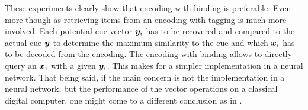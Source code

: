 These experiments clearly show that encoding with binding is preferable.
Even more though as retrieving items from an encoding with tagging is much more involved.
Each potential cue vector $\bm{y}_i$ has to be recovered and compared to the actual cue $\bm{y}$ to determine the maximum similarity to the cue and which $\bm{x}_i$ has to be decoded from the encoding.
The encoding with binding allows to directly query an $\bm{x}_i$ with a given $\bm{y}_i$.
This makes for a simpler implementation in a neural network.
That being said, if the main concern is not the implementation in a neural network, but the performance of the vector operations on a classical digital computer, one might come to a different conclusion as in \textcite{recchia2015}.
